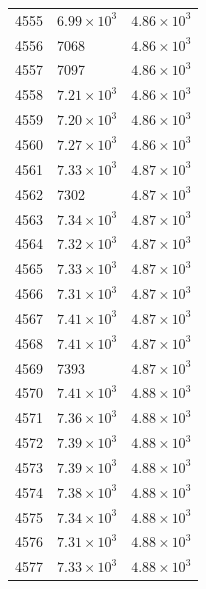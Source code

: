 \begin{table}[H]
\begin{tabular}{lll}
4555 & $\displaystyle 6.99 \times 10^{3}$ & $\displaystyle 4.86 \times 10^{3}$ \\
4556 & 7068 & $\displaystyle 4.86 \times 10^{3}$ \\
4557 & 7097 & $\displaystyle 4.86 \times 10^{3}$ \\
4558 & $\displaystyle 7.21 \times 10^{3}$ & $\displaystyle 4.86 \times 10^{3}$ \\
4559 & $\displaystyle 7.20 \times 10^{3}$ & $\displaystyle 4.86 \times 10^{3}$ \\
4560 & $\displaystyle 7.27 \times 10^{3}$ & $\displaystyle 4.86 \times 10^{3}$ \\
4561 & $\displaystyle 7.33 \times 10^{3}$ & $\displaystyle 4.87 \times 10^{3}$ \\
4562 & 7302 & $\displaystyle 4.87 \times 10^{3}$ \\
4563 & $\displaystyle 7.34 \times 10^{3}$ & $\displaystyle 4.87 \times 10^{3}$ \\
4564 & $\displaystyle 7.32 \times 10^{3}$ & $\displaystyle 4.87 \times 10^{3}$ \\
4565 & $\displaystyle 7.33 \times 10^{3}$ & $\displaystyle 4.87 \times 10^{3}$ \\
4566 & $\displaystyle 7.31 \times 10^{3}$ & $\displaystyle 4.87 \times 10^{3}$ \\
4567 & $\displaystyle 7.41 \times 10^{3}$ & $\displaystyle 4.87 \times 10^{3}$ \\
4568 & $\displaystyle 7.41 \times 10^{3}$ & $\displaystyle 4.87 \times 10^{3}$ \\
4569 & 7393 & $\displaystyle 4.87 \times 10^{3}$ \\
4570 & $\displaystyle 7.41 \times 10^{3}$ & $\displaystyle 4.88 \times 10^{3}$ \\
4571 & $\displaystyle 7.36 \times 10^{3}$ & $\displaystyle 4.88 \times 10^{3}$ \\
4572 & $\displaystyle 7.39 \times 10^{3}$ & $\displaystyle 4.88 \times 10^{3}$ \\
4573 & $\displaystyle 7.39 \times 10^{3}$ & $\displaystyle 4.88 \times 10^{3}$ \\
4574 & $\displaystyle 7.38 \times 10^{3}$ & $\displaystyle 4.88 \times 10^{3}$ \\
4575 & $\displaystyle 7.34 \times 10^{3}$ & $\displaystyle 4.88 \times 10^{3}$ \\
4576 & $\displaystyle 7.31 \times 10^{3}$ & $\displaystyle 4.88 \times 10^{3}$ \\
4577 & $\displaystyle 7.33 \times 10^{3}$ & $\displaystyle 4.88 \times 10^{3}$ \\

\end{tabular}
\end{table}
